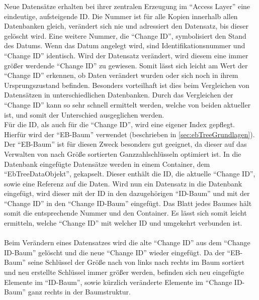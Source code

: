 \documentclass[a4paper,11pt,oneside,%
headsepline,												%
footsepline,												%
bibtotocnumbered									%
]{scrreprt}
\begin{document}
Neue Datensätze erhalten bei ihrer zentralen Erzeugung im \enquote{Access Layer} eine eindeutige, aufsteigende ID. Die Nummer ist für alle Kopien innerhalb allen Datenbanken gleich, verändert sich nie und adressiert den Datensatz, bis dieser gelöscht wird. Eine weitere Nummer, die \enquote{Change ID}, symbolisiert den Stand des Datums. Wenn das Datum angelegt wird, sind Identifikationsnummer und \enquote{Change ID} identisch. Wird der Datensatz verändert, wird diesem eine immer größer werdende \enquote{Change ID} zu gewiesen. Somit lässt sich leicht am Wert der \enquote{Change ID}  erkennen, ob Daten verändert wurden oder sich noch in ihrem Ursprungszustand befinden. Besonders vorteilhaft ist dies beim Vergleichen von Datensätzen in unterschiedlichen Datenbanken. Durch das Vergleichen der \enquote{Change ID} kann so sehr schnell ermittelt werden, welche von beiden aktueller ist, und somit der Unterschied ausgeglichen werden.\\

Für die ID, als auch für die \enquote{Change ID}, wird eine eigener Index gepflegt. Hierfür wird der \enquote{EB-Baum} verwendet (beschrieben in \autoref{sec:ebTreeGrundlagen}). Der \enquote{EB-Baum} ist für diesen Zweck besonders gut geeignet, da dieser auf das Verwalten von nach Größe sortierten Ganzzahlschlüsseln optimiert ist. In die Datenbank eingefügte Datensätze werden in einem Container, dem \enquote{EbTreeDataObjekt}, gekapselt. Dieser enthält  die ID, die aktuelle \enquote{Change ID}, sowie eine Referenz auf die Daten. Wird nun ein Datensatz in die Datenbank eingefügt, wird dieser mit der ID in den dazugehörigen \enquote{ID-Baum} und mit der \enquote{Change ID} in den \enquote{Change ID-Baum} eingefügt. Das Blatt jedes Baumes hält somit die entsprechende Nummer und den Container. Es lässt sich somit leicht ermitteln, welche \enquote{Change ID} mit welcher ID und umgekehrt verbunden ist. \\\\
Beim Verändern eines Datensatzes wird die alte \enquote{Change ID} aus dem \enquote{Change ID-Baum} gelöscht und die neue \enquote{Change ID} wieder eingefügt. Da der \enquote{EB-Baum} seine Schlüssel der Größe nach von links nach rechts im Baum sortiert und neu erstellte Schlüssel immer größer werden, befinden sich neu eingefügte Elemente im \enquote{ID-Baum}, sowie kürzlich veränderte Elemente im \enquote{Change ID-Baum} ganz rechts in der Baumstruktur.\\
\end{document}
